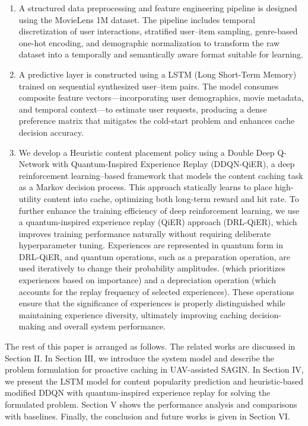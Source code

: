 \documentclass[journal]{IEEEtran}
\begin{document}
 \begin{enumerate}
    \item A structured data preprocessing and feature engineering pipeline is designed using the MovieLens 1M dataset. The pipeline includes temporal discretization of user interactions, stratified user–item sampling, genre-based one-hot encoding, and demographic normalization to transform the raw dataset into a temporally and semantically aware format suitable for learning.

    \item A predictive layer is constructed using a LSTM (Long Short-Term Memory) trained on sequential synthesized user–item pairs. The model consumes composite feature vectors—incorporating user demographics, movie metadata, and temporal context—to estimate user requests, producing a dense preference matrix that mitigates the cold-start problem and enhances cache decision accuracy.

    \item We develop a Heuristic content placement policy using a Double Deep Q-Network with Quantum-Inspired Experience Replay (DDQN-QiER), a deep reinforcement learning–based framework that models the content caching task as a Markov decision process. This approach statically learns to place high-utility content into cache, optimizing both long-term reward and hit rate. To further enhance the training efficiency of deep reinforcement learning, we use a quantum-inspired experience replay (QiER) approach (DRL-QiER), which improves training performance naturally without requiring deliberate hyperparameter tuning. Experiences are represented in quantum form in DRL-QiER, and quantum operations, such as a preparation operation, are used iteratively to change their probability amplitudes. (which prioritizes experiences based on importance) and a depreciation operation (which accounts for the replay frequency of selected experiences). These operations ensure that the significance of experiences is properly distinguished while maintaining experience diversity, ultimately improving caching decision-making and overall system performance.
\end{enumerate}
The rest of this paper is arranged as follows. The related works are discussed in Section $\mathrm{II}$. In Section $\mathrm{III}$, we introduce the system model and describe the problem formulation for proactive caching in UAV-assisted SAGIN. In Section $\mathrm{IV}$, we present the LSTM model for content popularity prediction and heuristic-based modified DDQN with quantum-inspired experience replay for solving the formulated problem. Section $\mathrm{V}$ shows the performance analysis and comparisons with baselines. Finally, the conclusion and future works is given in Section $\mathrm{VI}$.
\end{document}
